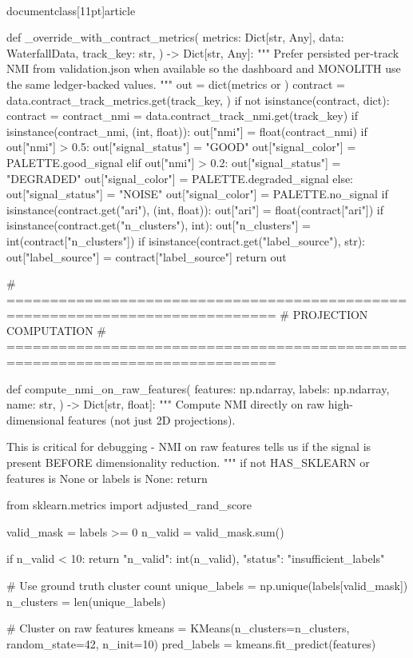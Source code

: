 \\documentclass[11pt]{article}
\begin{document}
\begin{CodeBlock}
def _override_with_contract_metrics(
    metrics: Dict[str, Any],
    data: WaterfallData,
    track_key: str,
) -> Dict[str, Any]:
    """
    Prefer persisted per-track NMI from validation.json when available so the
    dashboard and MONOLITH use the same ledger-backed values.
    """
    out = dict(metrics or {})
    contract = data.contract_track_metrics.get(track_key, {})
    if not isinstance(contract, dict):
        contract = {}
    contract_nmi = data.contract_track_nmi.get(track_key)
    if isinstance(contract_nmi, (int, float)):
        out["nmi"] = float(contract_nmi)
        if out["nmi"] > 0.5:
            out["signal_status"] = "GOOD"
            out["signal_color"] = PALETTE.good_signal
        elif out["nmi"] > 0.2:
            out["signal_status"] = "DEGRADED"
            out["signal_color"] = PALETTE.degraded_signal
        else:
            out["signal_status"] = "NOISE"
            out["signal_color"] = PALETTE.no_signal
    if isinstance(contract.get("ari"), (int, float)):
        out["ari"] = float(contract["ari"])
    if isinstance(contract.get("n_clusters"), int):
        out["n_clusters"] = int(contract["n_clusters"])
    if isinstance(contract.get("label_source"), str):
        out["label_source"] = contract["label_source"]
    return out


# =============================================================================
# PROJECTION COMPUTATION
# =============================================================================

def compute_nmi_on_raw_features(
    features: np.ndarray,
    labels: np.ndarray,
    name: str,
) -> Dict[str, float]:
    """
    Compute NMI directly on raw high-dimensional features (not just 2D projections).

    This is critical for debugging - NMI on raw features tells us if the signal
    is present BEFORE dimensionality reduction.
    """
    if not HAS_SKLEARN or features is None or labels is None:
        return {}

    from sklearn.metrics import adjusted_rand_score

    valid_mask = labels >= 0
    n_valid = valid_mask.sum()

    if n_valid < 10:
        return {"n_valid": int(n_valid), "status": "insufficient_labels"}

    # Use ground truth cluster count
    unique_labels = np.unique(labels[valid_mask])
    n_clusters = len(unique_labels)

    # Cluster on raw features
    kmeans = KMeans(n_clusters=n_clusters, random_state=42, n_init=10)
    pred_labels = kmeans.fit_predict(features)


\end{CodeBlock}
\end{document}
